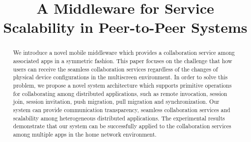\documentclass[conference]{IEEEtran}
\begin{document}
    \title{A Middleware for Service Scalability in Peer-to-Peer Systems }

    \author{
    }

    \maketitle

\begin{abstract}
We introduce a novel mobile middleware which provides a collaboration service among associated apps in a symmetric fashion.
This paper focuses on the challenge that how users can  receive the seamless collaboration services regardless of the changes of physical device configurations in the multiscreen environment.
In order to solve this problem, we propose a novel system architecture which supports primitive operations for collaborating among distributed applications, such as remote invocation, session join, session invitation,  push migration, pull migration and synchronization.
Our system can provide communication transparency, seamless collaboration services and scalability among heterogeneous distributed applications.
The experimental results demonstrate that our system can be successfully applied to the collaboration services among multiple apps in the home network environment.
\end{abstract}
\end{document}
